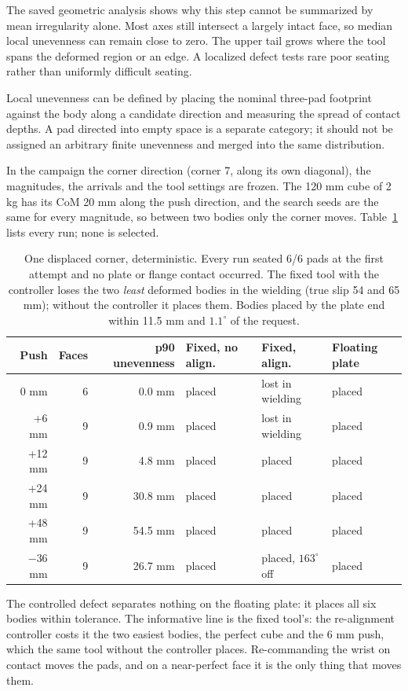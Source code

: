 The saved geometric analysis shows why this step cannot be summarized by mean irregularity alone. Most axes still intersect a largely intact face, so median local unevenness can remain close to zero. The upper tail grows where the tool spans the deformed region or an edge. A localized defect tests rare poor seating rather than uniformly difficult seating.

Local unevenness can be defined by placing the nominal three-pad footprint against the body along a candidate direction and measuring the spread of contact depths. A pad directed into empty space is a separate category; it should not be assigned an arbitrary finite unevenness and merged into the same distribution.

In the campaign the corner direction (corner 7, along its own diagonal), the magnitudes, the arrivals and the tool settings are frozen. The 120 mm cube of 2 kg has its CoM 20 mm along the push direction, and the search seeds are the same for every magnitude, so between two bodies only the corner moves. Table~\ref{tab:one-corner} lists every run; none is selected.

\begin{table}[htbp]\centering\small
\begin{tabular}{@{}rrrlll@{}}\toprule
Push & Faces & p90 unevenness & Fixed, no align. & Fixed, align. & Floating plate\\
\midrule
0 mm & 6 & 0.0 mm & placed & lost in wielding & placed\\
+6 mm & 9 & 0.9 mm & placed & lost in wielding & placed\\
+12 mm & 9 & 4.8 mm & placed & placed & placed\\
+24 mm & 9 & 30.8 mm & placed & placed & placed\\
+48 mm & 9 & 54.5 mm & placed & placed & placed\\
$-36$ mm & 9 & 26.7 mm & placed & placed, $163^\circ$ off & placed\\
\bottomrule\end{tabular}
\caption{One displaced corner, deterministic. Every run seated 6/6 pads at the first attempt and no plate or flange contact occurred. The fixed tool with the controller loses the two \emph{least} deformed bodies in the wielding (true slip 54 and 65 mm); without the controller it places them. Bodies placed by the plate end within 11.5 mm and $1.1^\circ$ of the request.}
\label{tab:one-corner}
\end{table}

The controlled defect separates nothing on the floating plate: it places all six bodies within tolerance. The informative line is the fixed tool's: the re-alignment controller costs it the two easiest bodies, the perfect cube and the 6 mm push, which the same tool without the controller places. Re-commanding the wrist on contact moves the pads, and on a near-perfect face it is the only thing that moves them.

